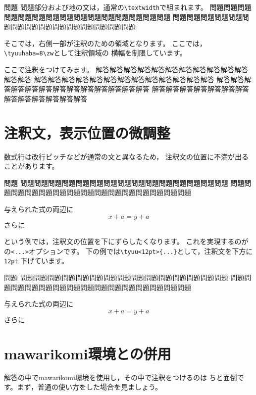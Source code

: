\documentclass[a4j,fleqn]{jarticle}
\begin{document}
{\zw\relax
\begin{itembox}{問題}
問題部分および地の文は，通常の\verb+\textwidth+で組まれます。
問題問題問題問題問題問題問題問題問題問題問題問題問題問題問題
問題問題問題問題問題問題問題問題問題問題問題問題問題問題問題
\end{itembox}
\begin{tyuukai}
そこでは，右側一部が注釈のための領域となります。
ここでは，\verb+\tyuuhaba=8\zw+として注釈領域の
横幅を制限しています。

ここで注釈をつけてみます。
解答解答解答解答解答解答解答解答解答解答解答解答解答
解答解答解答解答解答解答解答解答解答解答解答解答解答
解答解答解答解答解答解答解答解答解答解答解答解答解答
解答解答解答解答解答解答解答解答解答解答解答解答解答
\end{tyuukai}
}
\clearpage
\section{注釈文，表示位置の微調整}
数式行は改行ピッチなどが通常の文と異なるため，
注釈文の位置に不満が出ることがあります。
\begin{itembox}{問題}
問題問題問題問題問題問題問題問題問題問題問題問題問題問題問題
問題問題問題問題問題問題問題問題問題問題問題問題問題問題問題
\end{itembox}
\begin{tyuukai}
与えられた式の両辺に
%
\[ x+a=y+a \]
さらに
\end{tyuukai}
\bigskip

\noindent
という例では，注釈文の位置を下にずらしたくなります。
これを実現するのがの\verb+<...>+オプションです。
下の例では\verb+\tyuu<12pt>{...}+として，注釈文を下方に\texttt{12pt}
下げています。

\begin{itembox}{問題}
問題問題問題問題問題問題問題問題問題問題問題問題問題問題問題
問題問題問題問題問題問題問題問題問題問題問題問題問題問題問題
\end{itembox}
\begin{tyuukai}
与えられた式の両辺に
\tyuu<12pt>{$a$を加えて}%
\[ x+a=y+a \]
さらに
\end{tyuukai}
\clearpage

\section{\textsf{mawarikomi}環境との併用}
解答の中で\textsf{mawarikomi}環境を使用し，その中で注釈をつけるのは
ちと面倒です。まず，普通の使い方をした場合を見ましょう。
\end{document}
